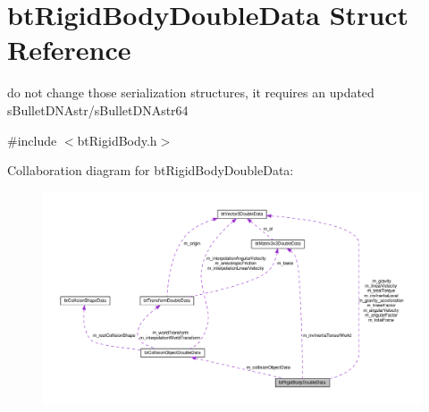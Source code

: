 \hypertarget{structbtRigidBodyDoubleData}{}\section{bt\+Rigid\+Body\+Double\+Data Struct Reference}
\label{structbtRigidBodyDoubleData}


do not change those serialization structures, it requires an updated s\+Bullet\+D\+N\+Astr/s\+Bullet\+D\+N\+Astr64  




{\ttfamily \#include $<$bt\+Rigid\+Body.\+h$>$}



Collaboration diagram for bt\+Rigid\+Body\+Double\+Data\+:
\nopagebreak
\begin{figure}[H]
\begin{center}
\leavevmode
\includegraphics[width=350pt]{structbtRigidBodyDoubleData__coll__graph}
\end{center}
\end{figure}
